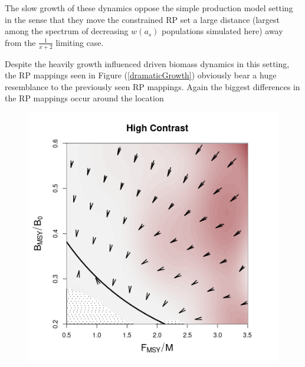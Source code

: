 %
The slow growth of these dynamics oppose the simple production model setting
in the sense that they move the constrained RP set a large distance (largest
among the spectrum of decreasing $w(a_s)$ populations simulated here)
away from the $\frac{1}{x+2}$ limiting case. 

%
Despite the heavily growth influenced driven biomass dynamics in this setting, 
the RP mappings seen in Figure (\ref{dramaticGrowth}) obviously bear a huge 
resemblance to the previously seen RP mappings. Again the biggest differences 
in the RP mappings occur around the location 
\begin{figure}[h!]
\begin{minipage}[h!]{0.44\textwidth}
\includegraphics[width=\textwidth]{../ddBias/directionalBiasDDSubExpT45N150A0-1AS2K0.1Reds 2.png}
\end{minipage}
\begin{minipage}[h!]{0.44\textwidth}

\end{minipage}
\end{figure}
